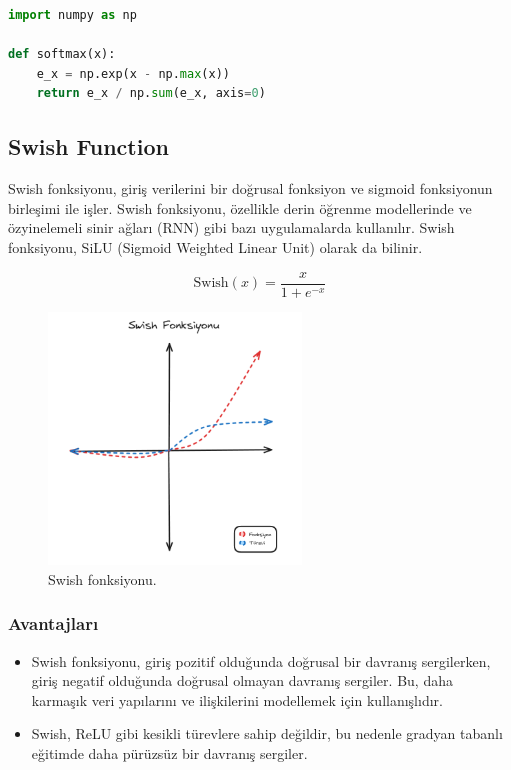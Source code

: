 \begin{lstlisting}[language=Python]
import numpy as np

def softmax(x):
    e_x = np.exp(x - np.max(x))
    return e_x / np.sum(e_x, axis=0)
\end{lstlisting}

\newpage

\subsection{Swish Function}
Swish fonksiyonu, giriş verilerini bir doğrusal fonksiyon ve sigmoid fonksiyonun birleşimi ile işler. Swish fonksiyonu, özellikle derin öğrenme modellerinde ve özyinelemeli sinir ağları (RNN) gibi bazı uygulamalarda kullanılır. Swish fonksiyonu, SiLU (Sigmoid Weighted Linear Unit) olarak da bilinir.

\[\text{Swish}(x) = \frac{x}{1 + e^{-x}}\]

\begin{figure}[h]
    \centering
    \includegraphics[width=0.6\textwidth]{images/swish_function.png}
    \caption{Swish fonksiyonu.}
    \label{fig:enter-label}
\end{figure}

\subsubsection{Avantajları}
\begin{itemize}
    \item Swish fonksiyonu, giriş pozitif olduğunda doğrusal bir davranış sergilerken, giriş negatif olduğunda doğrusal olmayan davranış sergiler. Bu, daha karmaşık veri yapılarını ve ilişkilerini modellemek için kullanışlıdır.
    \item Swish, ReLU gibi kesikli türevlere sahip değildir, bu nedenle gradyan tabanlı eğitimde daha pürüzsüz bir davranış sergiler.
\end{itemize}

